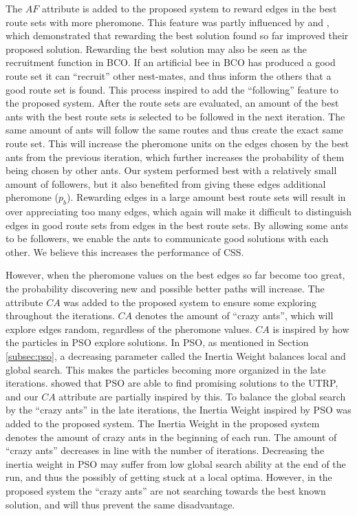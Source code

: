 The $AF$ attribute is added to the proposed system to reward edges in the best route sets with more pheromone. This feature was partly influenced by \citet{tripathi09} and \citet{sedighpour14}, which demonstrated that rewarding the best solution found so far improved their proposed solution. Rewarding the best solution may also be seen as the recruitment function in BCO. If an artificial bee in BCO has produced a good route set it can ``recruit'' other nest-mates, and thus inform the others that a good route set is found. This process inspired to add the ``following'' feature to the proposed system. After the route sets are evaluated, an amount of the best ants with the best route sets is selected to be followed in the next iteration. The same amount of ants will follow the same routes and thus create the exact same route set. This will increase the pheromone units on the edges chosen by the best ants from the previous iteration, which further increases the probability of them being chosen by other ants. Our system performed best with a relatively small amount of followers, but it also benefited from giving these edges additional pheromone ($p_b$). Rewarding edges in a large amount best route sets will result in over appreciating too many edges, which again will make it difficult to distinguish edges in good route sets from edges in the best route sets. By allowing some ants to be followers, we enable the ants to communicate good solutions with each other. We believe this increases the performance of CSS. 

However, when the pheromone values on the best edges so far become too great, the probability discovering new and possible better paths will increase. The attribute $CA$ was added to the proposed system to ensure some exploring throughout the iterations. $CA$ denotes the amount of ``crazy ants'', which will explore edges random, regardless of the pheromone values. $CA$ is inspired by how the particles in PSO explore solutions. In PSO, as mentioned in Section \vref{subsec:pso}, a decreasing parameter called the Inertia Weight balances local and global search. This makes the particles becoming more organized in the late iterations. \citet{kechagiopoulos14} showed that PSO are able to find promising solutions to the UTRP, and our $CA$ attribute are partially inspired by this. To balance the global search by the ``crazy ants'' in the late iterations, the Inertia Weight inspired by PSO was added to the proposed system. The Inertia Weight in the proposed system denotes the amount of crazy ants in the beginning of each run. The amount of ``crazy ants'' decreases in line with the number of iterations. Decreasing the inertia weight in PSO may suffer from low global search ability at the end of the run, and thus the possibly of getting stuck at a local optima. However, in the proposed system the ``crazy ants'' are not searching towards the best known solution, and will thus prevent the same disadvantage.

